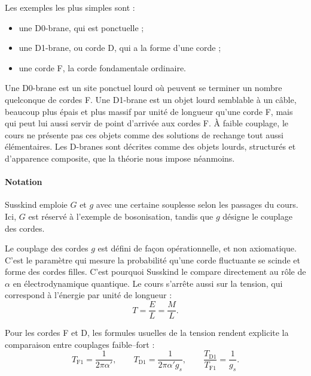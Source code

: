 Les exemples les plus simples sont :
\begin{itemize}
\item une D0-brane, qui est ponctuelle ;
\item une D1-brane, ou corde D, qui a la forme d’une corde ;
\item une corde F, la corde fondamentale ordinaire.
\end{itemize}
Une D0-brane est un site ponctuel lourd où peuvent se terminer un nombre quelconque de cordes F. Une D1-brane est un objet lourd semblable à un câble, beaucoup plus épais et plus massif par unité de longueur qu’une corde F, mais qui peut lui aussi servir de point d’arrivée aux cordes F. À faible couplage, le cours ne présente pas ces objets comme des solutions de rechange tout aussi élémentaires. Les D-branes sont décrites comme des objets lourds, structurés et d’apparence composite, que la théorie nous impose néanmoins.


\paragraph{Notation}
Susskind emploie \(G\) et \(g\) avec une certaine souplesse selon les passages du cours. Ici, \(G\) est réservé à l’exemple de bosonisation, tandis que \(g\) désigne le couplage des cordes.

Le couplage des cordes \(g\) est défini de façon opérationnelle, et non axiomatique. C’est le paramètre qui mesure la probabilité qu’une corde fluctuante se scinde et forme des cordes filles. C’est pourquoi Susskind le compare directement au rôle de \(\alpha\) en électrodynamique quantique. Le cours s’arrête aussi sur la tension, qui correspond à l’énergie par unité de longueur :
\begin{equation}
T=\frac{E}{L}=\frac{M}{L}.
\end{equation}

Pour les cordes F et D, les formules usuelles de la tension rendent explicite la comparaison entre couplages faible--fort :
\begin{equation}
T_{\mathrm{F1}}=\frac{1}{2\pi\alpha'},
\qquad
T_{\mathrm{D1}}=\frac{1}{2\pi\alpha' g_s},
\qquad
\frac{T_{\mathrm{D1}}}{T_{\mathrm{F1}}}=\frac{1}{g_s}.
\end{equation}

